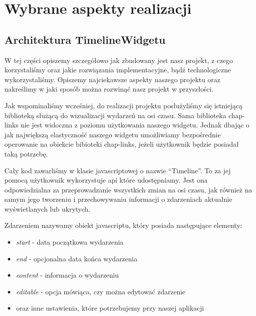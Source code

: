 \documentclass[polish,12pt]{aghthesis}
\begin{document}
\section{Wybrane aspekty realizacji}
\label{sec:wybrane-aspekty-realizacji}

\subsection{Architektura TimelineWidgetu}

W tej części opiszemy szczegółowo jak zbudowany jest nasz projekt, z czego korzystaliśmy oraz jakie rozwiązania implementacyjne, bądź technologiczne wykorzystaliśmy. Opiszemy najciekawsze aspekty naszego projektu oraz nakreślimy w jaki sposób można rozwinąć nasz projekt w przyszłości.

Jak wspominaliśmy wcześniej, do realizacji projektu posłużyliśmy się istniejącą biblioteką służącą do wizualizacji wydarzeń na osi czasu. Sama biblioteka chap-links nie jest widoczna z poziomu użytkowania naszego widgetu. Jednak dbając o jak największą elastyczność naszego widgetu umożliwiamy bezpośrednie operowanie na obiekcie bibioteki chap-links, jeżeli użytkownik będzie posiadał taką potrzebę.

Cały kod zawarliśmy w klasie javascriptowej o nazwie “Timeline”. To za jej pomocą użytkownik wykorzystuje api które udostępniamy. Jest ona odpowiedzialna za przeprowadzanie wszystkich zmian na osi czasu, jak również na samym jego tworzeniu i przechowywaniu informacji o zdarzeniach aktualnie wyświetlanych lub ukrytych.

Zdarzeniem nazywamy obiekt javascriptu, który posiada następujące elementy:

\begin{itemize}
	\item \textit{start} - data początkowa wydarzenia
	\item \textit{end} - opcjonalna data końca wydarzenia
	\item \textit{content} - informacja o wydarzeniu
	\item \textit{editable}  - opcja mówiąca, czy można edytować zdarzenie
	\item oraz inne ustawienia, które potrzebujemy przy naszej aplikacji
\end{itemize}
\end{document}
